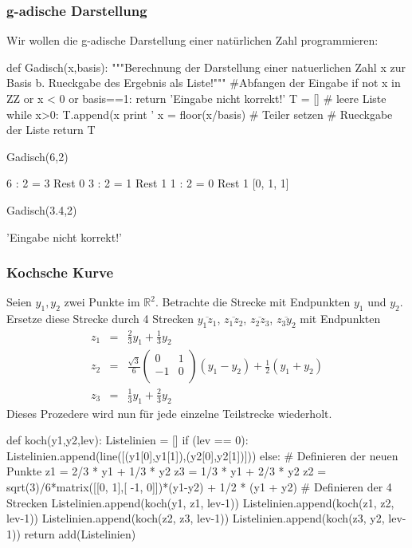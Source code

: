 \documentclass[fontsize=12pt,paper=a4,twoside,bibtotoc,idxtotoc,
liststotoc,pagesize,BCOR1.2cm,DIV15,chapterprefix,pagesize=pdftex]{scrbook}
\theoremstyle{plain}
\theoremstyle{definition}
\theoremstyle{remark}
\begin{document}
\subsubsection{g-adische Darstellung}
Wir wollen die g-adische Darstellung einer natürlichen Zahl programmieren:
\begin{sagein}
def Gadisch(x,basis):
    """Berechnung der Darstellung einer natuerlichen Zahl 
x zur Basis b. Rueckgabe des Ergebnis als Liste!"""
    #Abfangen der Eingabe
    if not x in ZZ or x < 0 or basis==1: 
        return 'Eingabe nicht korrekt!'
    T = []  # leere Liste 
    while x>0:
        T.append(x%
        print '%
        x = floor(x/basis) # Teiler setzen
    # Rueckgabe der Liste
    return T
\end{sagein}

\begin{sagein}
Gadisch(6,2)
\end{sagein}
\begin{sageout}
6 : 2 = 3 Rest 0
3 : 2 = 1 Rest 1
1 : 2 = 0 Rest 1
[0, 1, 1]
\end{sageout}

\begin{sagein}
Gadisch(3.4,2)
\end{sagein}
\begin{sageout}
'Eingabe nicht korrekt!'
\end{sageout}
\subsubsection{Kochsche Kurve}
Seien $y_1,y_2$ zwei Punkte im $\mathbb{R}^2$. Betrachte die Strecke mit Endpunkten $y_1$ und $y_2$. 
Ersetze  diese Strecke durch 4 Strecken 
$\overline{y_1 z_1}$, $\overline{z_1 z_2}$, $\overline{z_2 z_3}$,
$\overline{z_3 y_2}$ mit Endpunkten 
\begin{eqnarray*}
 z_1 &=&\frac23 y_1 + \frac13 y_2\\[0.5cm]
 z_2 &=& \frac{\sqrt{3}}{6} \left( \begin{array}{cc}
 0 & 1 \\ -1 & 0 \\
 \end{array} \right)
 (y_1 - y_2) + \frac12 (y_1 + y_2)\\[0.5cm]
 z_3 &=&\frac13 y_1 + \frac23 y_2
\end{eqnarray*}
 Dieses Prozedere wird nun für jede einzelne Teilstrecke wiederholt.
\begin{sagein}
def koch(y1,y2,lev):
    Listelinien = []
    if (lev == 0):
        Listelinien.append(line([(y1[0],y1[1]),(y2[0],y2[1])]))
    else:
        # Definieren der neuen Punkte 
        z1 = 2/3 * y1 + 1/3 * y2
        z3 = 1/3 * y1 + 2/3 * y2
        z2 = sqrt(3)/6*matrix([[0, 1],[ -1, 0]])*(y1-y2) + 1/2 * (y1 + y2)
        # Definieren der 4 Strecken
        Listelinien.append(koch(y1, z1, lev-1))
        Listelinien.append(koch(z1, z2, lev-1))
        Listelinien.append(koch(z2, z3, lev-1))
        Listelinien.append(koch(z3, y2, lev-1))
    return add(Listelinien)
\end{sagein}
\end{document}
